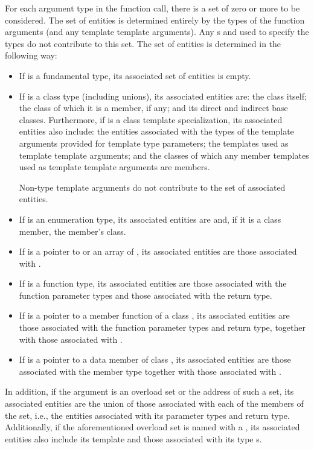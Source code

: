 \pnum
For each argument type  in the function call,
there is a set of zero or more 
to be considered.
The set of entities is determined entirely by
the types of the function arguments
(and any template template arguments).
Any s and 
used to specify the types
do not contribute to this set.
The set of entities
is determined in the following way:
\begin{itemize}
\item If  is a fundamental type, its associated set of
entities is empty.

\item If  is a class type (including unions),
its associated entities are:
the class itself;
the class of which it is a member, if any;
and its direct and indirect base classes.
Furthermore, if  is a class template specialization,
its associated entities also include:
the entities
associated with the types of the template arguments
provided for template type parameters;
the templates used as template template arguments; and
the classes of which any member templates used as template template
arguments are members.
\begin{note}
Non-type template arguments do not
contribute to the set of associated entities.
\end{note}

\item If  is an enumeration type,
its associated entities are 
and, if it is a class member, the member's class.

\item If  is a pointer to  or an array of ,
its associated entities are those associated with .

\item If  is a function type, its associated
entities are those associated with the function parameter types and those
associated with the return type.

\item If  is a pointer to a member function of a class
, its associated entities are those associated
with the function parameter types and return type, together with those
associated with .

\item If  is a pointer to a data member of class , its
associated entities are those associated with the member
type together with those associated with .
\end{itemize}
In addition, if the argument is an overload set or the address of such a set,
its associated entities
are the union of those associated with each of the
members of the set, i.e., the entities associated with its
parameter types and return type.
Additionally, if the aforementioned overload set is named with
a , its associated entities also include
its template  and
those associated with its type s.

